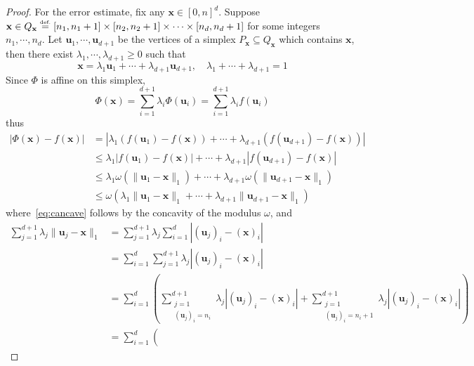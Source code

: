 \documentclass{article}
\numberwithin{equation}{section}
\theoremstyle{definition}
\newcommand{\eqdef}{\ensuremath{\stackrel{\mbox{\upshape\tiny def.}}{=}}}
\begin{document}
\begin{proof}
For the error estimate, fix any $\mathbf{x}\in[0,n]^d$. Suppose $\mathbf{x}\in Q_{\mathbf{x}}  \eqdef  [n_1,n_1+1] \times [n_2,n_2+1] \times \cdots \times [n_d,n_d+1]$ for some integers $n_1,\cdots,n_d$. Let $\mathbf{u}_1,\cdots,\mathbf{u}_{d+1}$ be the vertices of a simplex $P_{\mathbf{x}}\subseteq Q_{\mathbf{x}}$ which contains $\mathbf{x}$, then there exist $\lambda_1,\cdots,\lambda_{d+1} \ge 0$ such that 
$$\mathbf{x} = \lambda_1 \mathbf{u}_1 + \cdots + \lambda_{d+1} \mathbf{u}_{d+1}, \quad
\lambda_1 + \cdots + \lambda_{d+1} = 1$$
Since $\Phi$ is affine on this simplex,
\[
    \Phi(\mathbf{x}) 
    = 
    \sum_{i=1}^{d+1} \lambda_i \Phi(\mathbf{u}_i)
    =
    \sum_{i=1}^{d+1} \lambda_i f(\mathbf{u}_i)
\]
thus
\allowdisplaybreaks
\begin{align}
\nonumber
    | \Phi(\mathbf{x}) - f(\mathbf{x}) | 
    &= | \lambda_1 (f(\mathbf{u}_1) - f(\mathbf{x}))
       + \cdots
       + \lambda_{d+1} (f(\mathbf{u}_{d+1}) - f(\mathbf{x})) |  \\
\nonumber
    &\le \lambda_1 | f(\mathbf{u}_1) - f(\mathbf{x}) |
         + \cdots
         + \lambda_{d+1} | f(\mathbf{u}_{d+1}) - f(\mathbf{x}) |  \\
\nonumber
    &\le \lambda_1 \omega( \| \mathbf{u}_1 - \mathbf{x} \|_1 )
         + \cdots
         + \lambda_{d+1} \omega( \| \mathbf{u}_{d+1} - \mathbf{x} \|_1 )  \\
\label{eq:cancave}
    &
    \le \omega( \lambda_1 \| \mathbf{u}_1 - \mathbf{x} \|_1
                 + \cdots
                 + \lambda_{d+1} \| \mathbf{u}_{d+1} - \mathbf{x} \|_1 )  
\end{align}
where~\eqref{eq:cancave} follows by the concavity of the modulus $\omega$,
and 
\begin{align*}
    \sum_{j=1}^{d+1}
    \lambda_j \| \mathbf{u}_j - \mathbf{x} \|_1
    &= \sum_{j=1}^{d+1} 
       \lambda_j \sum_{i=1}^d | (\mathbf{u}_j)_i - (\mathbf{x})_i |  \\
    &= \sum_{i=1}^d 
       \sum_{j=1}^{d+1}  \lambda_j | (\mathbf{u}_j)_i - (\mathbf{x})_i |  \\
    &= \sum_{i=1}^d \left(
       \sum_{\substack{j=1 \\ (\mathbf{u}_j)_i = n_i}} ^ {d+1}  
       \lambda_j | (\mathbf{u}_j)_i - (\mathbf{x})_i |
       +
       \sum_{\substack{j=1 \\ (\mathbf{u}_j)_i = n_i + 1}} ^ {d+1}  
       \lambda_j | (\mathbf{u}_j)_i - (\mathbf{x})_i |
       \right)  \\
    &= \sum_{i=1}^d \left(

\end{align*}
\end{proof}
\end{document}
